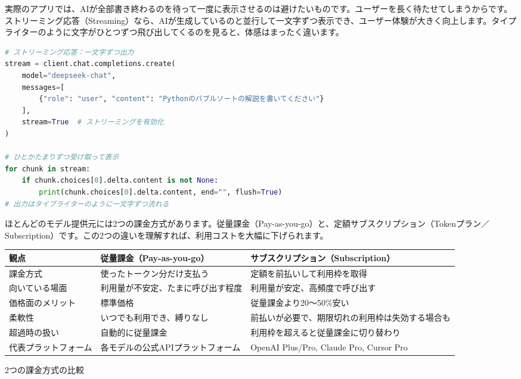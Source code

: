 
実際のアプリでは、AIが全部書き終わるのを待って一度に表示させるのは避けたいものです。ユーザーを長く待たせてしまうからです。ストリーミング応答（Streaming）なら、AIが生成しているのと並行して一文字ずつ表示でき、ユーザー体験が大きく向上します。タイプライターのように文字がひとつずつ飛び出してくるのを見ると、体感はまったく違います。

\begin{lstlisting}[language=Python]
# ストリーミング応答：一文字ずつ出力
stream = client.chat.completions.create(
    model="deepseek-chat",
    messages=[
        {"role": "user", "content": "Pythonのバブルソートの解説を書いてください"}
    ],
    stream=True  # ストリーミングを有効化
)

# ひとかたまりずつ受け取って表示
for chunk in stream:
    if chunk.choices[0].delta.content is not None:
        print(chunk.choices[0].delta.content, end="", flush=True)
# 出力はタイプライターのように一文字ずつ流れる
\end{lstlisting}


ほとんどのモデル提供元には2つの課金方式があります。従量課金（Pay-as-you-go）と、定額サブスクリプション（Tokenプラン／Subscription）です。この2つの違いを理解すれば、利用コストを大幅に下げられます。


\begin{center}
\begin{tabularx}{\linewidth}{|X|X|X|}
\hline
\textbf{観点} & \textbf{従量課金（Pay-as-you-go）} & \textbf{サブスクリプション（Subscription）} \tabularnewline
\hline
課金方式 & 使ったトークン分だけ支払う & 定額を前払いして利用枠を取得 \tabularnewline
向いている場面 & 利用量が不安定、たまに呼び出す程度 & 利用量が安定、高頻度で呼び出す \tabularnewline
価格面のメリット & 標準価格 & 従量課金より20〜50\%安い \tabularnewline
柔軟性 & いつでも利用でき、縛りなし & 前払いが必要で、期限切れの利用枠は失効する場合も \tabularnewline
超過時の扱い & 自動的に従量課金 & 利用枠を超えると従量課金に切り替わり \tabularnewline
代表プラットフォーム & 各モデルの公式APIプラットフォーム & OpenAI Plus/Pro, Claude Pro, Cursor Pro \tabularnewline
\hline
\end{tabularx}
\end{center}

\begin{center}\small\color{gray}2つの課金方式の比較\end{center}

